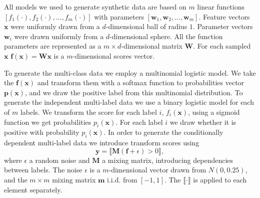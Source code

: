 \documentclass{article}
\renewcommand{\vec}[1]{\boldsymbol{#1}}
\newcommand{\bx}{\vec{x}}
\newcommand{\by}{\vec{y}}
\newcommand{\assert}[1]{\llbracket #1 \rrbracket}
\begin{document}
All models we used to generate synthetic data are based on $m$ linear functions $[f_1(\cdot), f_2(\cdot), \ldots, f_m(\cdot)]$ with parameters $[\boldsymbol{w}_1, \boldsymbol{w}_2, \ldots, \boldsymbol{w}_m]$. Feature vectors $\bx$ were uniformly drawn from a $d$-dimensional ball of radius $1$. Parameter vectors $\boldsymbol{w}_i$ were drawn uniformly from a $d$-dimensional sphere. All the function parameters are represented as a $m \times d$-dimensional matrix $\boldsymbol{W}$. For each sampled $\bx$ $\boldsymbol{f}(\bx) = \boldsymbol{W}\bx$  is a $m$-dimensional scores vector.

To generate the multi-class data we employ a multinomial logistic model. We take the $\boldsymbol{f}(\bx)$ and transform them with a softmax function to probabilities vector $\boldsymbol{p}(\bx)$, and we draw the positive label from this multinomial distribution.
To generate the independent multi-label data we use a binary logistic model for each of $m$ labels. We transform the score for each label $i$, $f_i(\bx)$, using a sigmoid function we get probabilities $p_i(\bx)$. For each label $i$ we draw whether it is positive with probability $p_i(\bx)$. In order to generate the conditionally dependent multi-label data we introduce transform scores using 
\begin{equation*}
\by = \assert{\boldsymbol{M} (\boldsymbol{f} +  \epsilon ) >  0  },
\end{equation*}
where $\epsilon$ a random noise and $\boldsymbol{M}$ a mixing matrix, introducing dependencies between labels. The noise $\epsilon$ is a $m$-dimensional vector drawn from $N(0, 0.25)$, and the $m \times m$ mixing matrix $\boldsymbol{m}$ i.i.d. from $[-1, 1]$. The $\assert{\cdot}$ is applied to each element separately.
\end{document}
